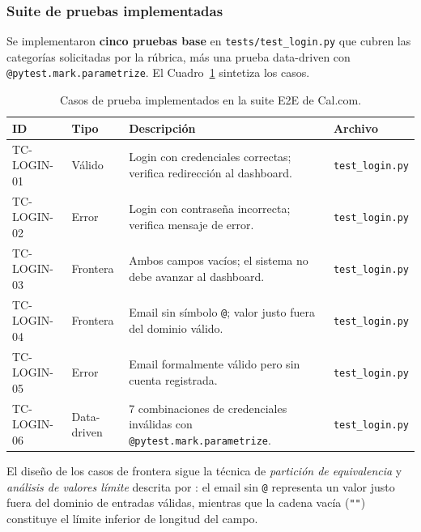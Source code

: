 \documentclass{article}
\begin{document}
\subsubsection{Suite de pruebas implementadas}

Se implementaron \textbf{cinco pruebas base} en \texttt{tests/test\_login.py}
que cubren las categorías solicitadas por la rúbrica, más una prueba
data-driven con \texttt{@pytest.mark.parametrize}. El Cuadro~\ref{tab:casos-prueba}
sintetiza los casos.

\begin{table}[htbp]
  \centering
  \caption{Casos de prueba implementados en la suite E2E de Cal.com.}
  \label{tab:casos-prueba}
  \begin{tabular}{llp{5.5cm}l}
    \toprule
    \textbf{ID} & \textbf{Tipo} & \textbf{Descripción} & \textbf{Archivo} \\
    \midrule
    TC-LOGIN-01 & Válido    & Login con credenciales correctas; verifica redirección al dashboard.
                           & \texttt{test\_login.py} \\
    TC-LOGIN-02 & Error     & Login con contraseña incorrecta; verifica mensaje de error.
                           & \texttt{test\_login.py} \\
    TC-LOGIN-03 & Frontera  & Ambos campos vacíos; el sistema no debe avanzar al dashboard.
                           & \texttt{test\_login.py} \\
    TC-LOGIN-04 & Frontera  & Email sin símbolo \texttt{@}; valor justo fuera del dominio válido.
                           & \texttt{test\_login.py} \\
    TC-LOGIN-05 & Error     & Email formalmente válido pero sin cuenta registrada.
                           & \texttt{test\_login.py} \\
    TC-LOGIN-06 & Data-driven & 7 combinaciones de credenciales inválidas con
                               \texttt{@pytest.mark.parametrize}.
                           & \texttt{test\_login.py} \\
    \bottomrule
  \end{tabular}
\end{table}

El diseño de los casos de frontera sigue la técnica de \textit{partición
de equivalencia} y \textit{análisis de valores límite} descrita por
\textcite{Jorgensen2022}: el email sin \texttt{@} representa un valor
justo fuera del dominio de entradas válidas, mientras que la cadena vacía
(\texttt{""}) constituye el límite inferior de longitud del campo.
\end{document}
